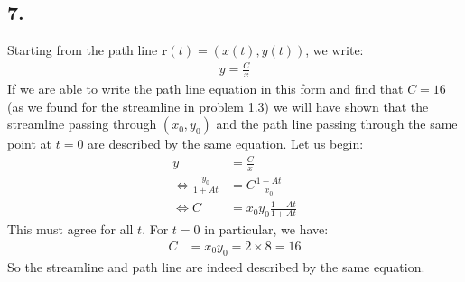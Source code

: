 \documentclass[a4paper, 12pt]{article}
\begin{document}
\subsection*{7.}
Starting from the path line $\mathbf{r}(t) = (x(t), y(t))$, we write:
\begin{align*}
	y = \frac{C}{x}
\end{align*}
If we are able to write the path line equation in this form and find that $C=16$ (as we found for the streamline in problem 1.3) we will have shown that the streamline passing through $(x_0,y_0)$ and the path line passing through the same point at $t=0$ are described by the same equation. Let us begin:
\begin{align*}
	y &= \frac{C}{x} \\
	\Leftrightarrow \frac{y_0}{1 + A t} &= C \frac{1 - A t}{x_0} \\
	\Leftrightarrow C &= x_0 y_0 \frac{1 - A t}{1 + A t}
\end{align*}
This must agree for all $t$. For $t=0$ in particular, we have:
\begin{align*}
	C &= x_0 y_0 = 2 \times 8 = 16
\end{align*}
So the streamline and path line are indeed described by the same equation.
\end{document}

